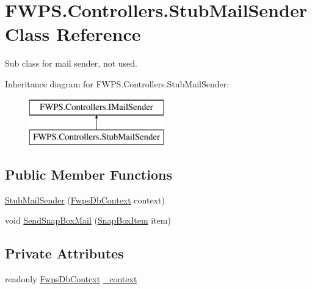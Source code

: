 \hypertarget{class_f_w_p_s_1_1_controllers_1_1_stub_mail_sender}{}\section{F\+W\+P\+S.\+Controllers.\+Stub\+Mail\+Sender Class Reference}
\label{class_f_w_p_s_1_1_controllers_1_1_stub_mail_sender}


Sub class for mail sender, not used.  


Inheritance diagram for F\+W\+P\+S.\+Controllers.\+Stub\+Mail\+Sender\+:\begin{figure}[H]
\begin{center}
\leavevmode
\includegraphics[height=2.000000cm]{class_f_w_p_s_1_1_controllers_1_1_stub_mail_sender}
\end{center}
\end{figure}
\subsection*{Public Member Functions}
\begin{DoxyCompactItemize}
\item 
\mbox{\hyperlink{class_f_w_p_s_1_1_controllers_1_1_stub_mail_sender_aaed5b671394326b4127d5f5b560194dc}{Stub\+Mail\+Sender}} (\mbox{\hyperlink{class_f_w_p_s_1_1_data_1_1_fwps_db_context}{Fwps\+Db\+Context}} context)
\item 
void \mbox{\hyperlink{class_f_w_p_s_1_1_controllers_1_1_stub_mail_sender_a6830add052b5fcb2bde3aefc2678d532}{Send\+Snap\+Box\+Mail}} (\mbox{\hyperlink{class_f_w_p_s_1_1_models_1_1_snap_box_item}{Snap\+Box\+Item}} item)
\end{DoxyCompactItemize}
\subsection*{Private Attributes}
\begin{DoxyCompactItemize}
\item 
readonly \mbox{\hyperlink{class_f_w_p_s_1_1_data_1_1_fwps_db_context}{Fwps\+Db\+Context}} \mbox{\hyperlink{class_f_w_p_s_1_1_controllers_1_1_stub_mail_sender_a81ac7a4adde6f0c16a9a111cc358d1bd}{\+\_\+context}}
\end{DoxyCompactItemize}


